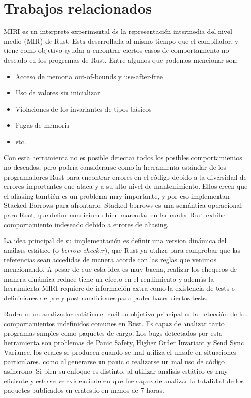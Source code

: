 \section{Trabajos relacionados}

MIRI \cite{miri} es un interprete experimental de la representación intermedia del nivel medio (MIR) de Rust. Esta desarrollada al mismo tiempo que el compilador, y tiene como objetivo ayudar a encontrar ciertos casos de comportamiento no deseado en los programas de Rust. Entre algunos que podemos mencionar son:
\begin{itemize}
    \item Acceso de memoria out-of-bounds y use-after-free
    \item Uso de valores sin inicializar
    \item Violaciones de los invariantes de tipos básicos
    \item Fugas de memoria
    \item etc.
\end{itemize}
Con esta herramienta no es posible detectar todos los posibles comportamientos no deseados, pero podría considerarse como la herramienta estándar de los programadores Rust para encontrar errores en el código debido a la diversidad de errores importantes que ataca y a su alto nivel de mantenimiento. Ellos creen que el aliasing también es un problema muy importante, y por eso implementan Stacked Borrows \cite{stackedborrows} para afrontarlo. Stacked borrows es una semántica operacional  para Rust, que define condiciones bien marcadas en las cuales Rust exhibe comportamiento indeseado debido a errores de aliasing.

La idea principal de su implementación es definir una version dinámica del análisis estático (o \textit{borrow-checker}), que Rust ya utiliza para comprobar que las referencias sean accedidas de manera acorde con las reglas que venimos mencionando. A pesar de que esta idea es muy buena, realizar los chequeos de manera dinámica reduce tiene un efecto en el rendimiento y además la herramienta MIRI requiere de información extra como la existencia de tests o definiciones de pre y post condiciones para poder hacer ciertos tests.

Rudra \cite{rudra} es un analizador estático el cuál su objetivo principal es la detección de los comportamientos indefinidos comunes en Rust. Es capaz de analizar tanto programas simples como paquetes de cargo. Los bugs detectados por esta herramienta son problemas de Panic Safety, Higher Order Invariant y Send Sync Variance, los cuales se producen cuando se mal utiliza el unsafe en situaciones particulares, como al generarse un panic o realizarse un mal uso de código asíncrono. Si bien su enfoque es distinto, al utilizar análisis estático es muy eficiente y esto se ve evidenciado en que fue capaz de analizar la totalidad de los paquetes publicados en crates.io en menos de 7 horas.

